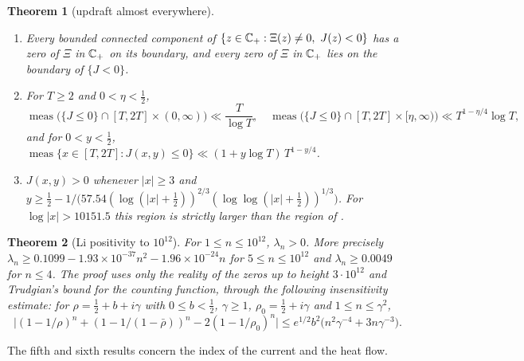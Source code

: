 \documentclass[11pt]{article}
\newtheorem{theorem}{Theorem}[section]
\theoremstyle{definition}\newtheorem{definition}[theorem]{Definition}
\theoremstyle{remark}\newtheorem{remark}[theorem]{Remark}
\begin{document}
\begin{theorem}[updraft almost everywhere]\label{mt:updraft}
\begin{enumerate}[label=(\roman*)]
\item Every bounded connected component of $\{z\in\mathbb C_+:\Xi(z)\ne0,\ J(z)<0\}$ has a zero of $\Xi$ in $\mathbb C_+$ on its boundary, and every zero of $\Xi$ in $\mathbb C_+$ lies on the boundary of $\{J<0\}$.
\item For $T\ge2$ and $0<\eta<\frac12$,
\[
\operatorname{meas}\bigl(\{J\le0\}\cap[T,2T]\times(0,\infty)\bigr)\ll\frac T{\log T},\quad \operatorname{meas}\bigl(\{J\le0\}\cap[T,2T]\times[\eta,\infty)\bigr)\ll T^{1-\eta/4}\log T,
\]
and for $0<y<\frac12$, $\operatorname{meas}\{x\in[T,2T]:J(x,y)\le0\}\ll(1+y\log T)\,T^{1-y/4}$.
\item $J(x,y)>0$ whenever $|x|\ge3$ and $y\ge\frac12-1/\bigl(57.54(\log(|x|+\frac12))^{2/3}(\log\log(|x|+\frac12))^{1/3}\bigr)$. For $\log|x|>10151.5$ this region is strictly larger than the region of \cite{S01}.
\end{enumerate}
\end{theorem}

\begin{theorem}[Li positivity to $10^{12}$]\label{mt:li}
For $1\le n\le10^{12}$, $\lambda_n>0$. More precisely $\lambda_n\ge0.1099-1.93\times10^{-37}n^2-1.96\times10^{-24}n$ for $5\le n\le10^{12}$ and $\lambda_n\ge0.0049$ for $n\le4$. The proof uses only the reality of the zeros up to height $3\cdot10^{12}$ and Trudgian's bound for the counting function, through the following insensitivity estimate: for $\rho=\frac12+b+i\gamma$ with $0\le b<\frac12$, $\gamma\ge1$, $\rho_0=\frac12+i\gamma$ and $1\le n\le\gamma^2$,
\[
\bigl|(1-1/\rho)^n+(1-1/(1-\bar\rho))^n-2(1-1/\rho_0)^n\bigr|\le e^{1/2}b^2\bigl(n^2\gamma^{-4}+3n\gamma^{-3}\bigr).
\]
\end{theorem}

The fifth and sixth results concern the index of the current and the heat flow.
\end{document}
